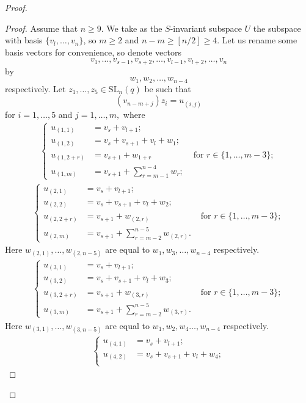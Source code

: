 \documentclass[a4paper,reqno,11pt]{amsart}
\theoremstyle{definition}
\theoremstyle{remark}
\numberwithin{equation}{section}
\newcommand{\SL}{{\mathrm{SL}}}
\begin{document}
\begin{proof}
\begin{proof}
Assume that $n \ge 9$. We take as the $S$-invariant subspace $U$ the subspace with  basis $\{v_{l}, \ldots, v_n\}$, so
$m\ge 2$ and $n-m\ge [n/2] \ge 4.$  Let us rename some basis vectors for convenience, so denote vectors 
$$v_1, \ldots, v_{s-1}, v_{s+2}, \ldots, v_{l-1}, v_{l+2}, \ldots, v_{n}$$ by $$w_1, w_2, \ldots, w_{n-4}$$ respectively.
Let $z_1, \ldots, z_5 \in \SL_n(q)$ be such that $$(v_{n-m+j})z_i=u_{(i,j)}$$ for $i=1, \ldots, 5$ and $j=1, \ldots, m,$ where
\begin{gather}\label{orb2t1}
\left\{ 
\begin{aligned}
u_{(1,1)} & = v_{s} + v_{l+1};\\
u_{(1,2)} & = v_{s}+ v_{s+1}+v_{l}+w_1;\\
u_{(1,2+r)} & =v_{s+1}+w_{1+r}\phantom{;} &\text{ for } r \in \{1, \ldots, m-3\};\\
u_{(1,m)} & =v_{s+1}+\sum_{r=m-1}^{n-4}w_r;
\end{aligned}
\right.
\end{gather}
\begin{gather}%
\left\{ 
\begin{aligned}
u_{(2,1)} & = v_{s} + v_{l+1};\\
u_{(2,2)} & = v_{s}+v_{s+1}+v_{l}+w_2;\\
u_{(2,2+r)} & =v_{s+1}+w_{(2,r)}\phantom{;} &\text{ for } r \in \{1, \ldots, m-3\};\\
u_{(2,m)} & =v_{s+1}+\sum_{r=m-2}^{n-5}w_{(2,r)}.
\end{aligned}
\right. 
\end{gather}
Here $w_{(2,1)}, \ldots, w_{(2,n-5)}$ are equal to $w_1, w_3, \ldots, w_{n-4}$ respectively.  
\begin{gather}
\left\{ 
\begin{aligned}
u_{(3,1)} & = v_{s} + v_{l+1};\\
u_{(3,2)} & = v_{s}+ v_{s+1}+v_{l}+w_3;\\
u_{(3,2+r)} & =v_{s+1}+w_{(3,r)}\phantom{;} &\text{ for } r \in \{1, \ldots, m-3\};\\
u_{(3,m)} & =v_{s+1}+\sum_{r=m-2}^{n-5}w_{(3,r)}.
\end{aligned}
\right.
\end{gather} 
Here $w_{(3,1)}, \ldots, w_{(3,n-5)}$ are equal to $w_1, w_2, w_4 \ldots, w_{n-4}$ respectively.  
\begin{gather} 
\left\{ 
\begin{aligned}%
u_{(4,1)} & = v_{s} + v_{l+1};\\
u_{(4,2)} & = v_{s}+ v_{s+1}+v_{l}+w_4;\\

\end{aligned}
\end{gather}
\end{proof}
\end{proof}
\end{document}
